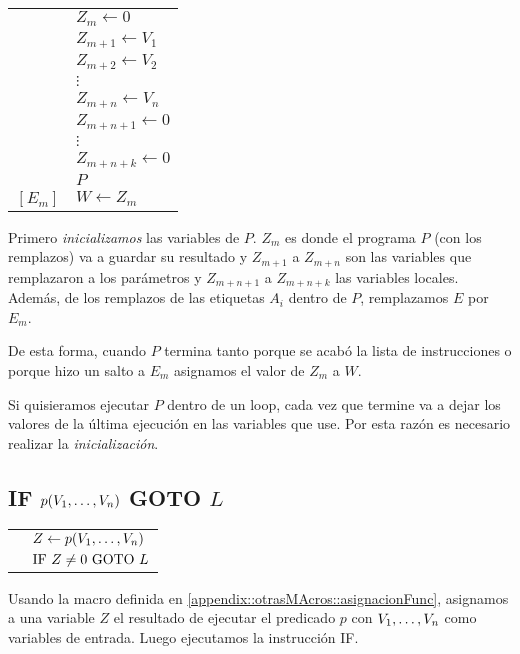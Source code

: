 \begin{multicols}{2}
\begin{center}
\begin{tabular}{ll}
	&$Z_m \leftarrow 0$ \\
	&$Z_{m+1} \leftarrow V_1$ \\
	&$Z_{m+2} \leftarrow V_2$ \\
	&$\vdots$ \\
	&$Z_{m+n} \leftarrow V_n$ \\
	&$Z_{m+n+1} \leftarrow 0$ \\
	&$\vdots$ \\
	&$Z_{m+n+k} \leftarrow 0$ \\
	&$P$ \\
	$[E_m]$ & $W\leftarrow Z_m$ \\ 
\end{tabular}
\end{center}

\columnbreak
Primero \textit{inicializamos} las variables de $P$. $Z_{m}$ es donde el programa $P$ (con los remplazos) va a guardar su resultado y $Z_{m+1}$ a $Z_{m+n}$ son las variables que remplazaron a los parámetros y $Z_{m+n+1}$ a $Z_{m+n+k}$ las variables locales. Además, de los remplazos de las etiquetas $A_i$ dentro de $P$, remplazamos $E$ por $E_m$.

De esta forma, cuando $P$ termina tanto porque se acabó la lista de instrucciones o porque hizo un salto a $E_m$ asignamos el valor de $Z_m$ a $W$.
\end{multicols}
Si quisieramos ejecutar $P$ dentro de un loop, cada vez que termine va a dejar los valores de la última ejecución en las variables que use. Por esta razón es necesario realizar la \textit{inicialización}.


\subsection{IF ${p(V_1,\dots, V_{n})}$ GOTO $L$}\label{appendix::otrasMAcros::ifPredicado}
\begin{multicols}{2}
\begin{tabular}{ll}
	& $Z \leftarrow p(V_1,\dots, V_{n})$ \\
	& $\text{IF }Z \neq 0 \text{ GOTO } L$
\end{tabular}

\columnbreak
Usando la macro definida en \ref{appendix::otrasMAcros::asignacionFunc}, asignamos a una variable $Z$ el resultado de ejecutar el predicado $p$ con $V_1,\dots, V_{n}$ como variables de entrada. Luego ejecutamos la instrucción IF.
\end{multicols}

